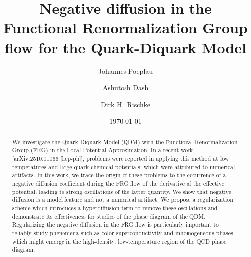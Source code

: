 \documentclass[
onecolumn,
aps,
prd,
amsmath,
amssymb,
nofootinbib
]{revtex4-2}
\begin{document}

\title{\textbf{Negative diffusion in the Functional Renormalization Group flow for the Quark-Diquark Model} 
}%


\author{Johannes Poeplau}
\author{Ashutosh Dash}%


\author{Dirk H.~Rischke}


\date{\today}%

\begin{abstract} 
We investigate the Quark-Diquark Model (QDM) with the Functional Renormalization Group (FRG)  in the Local Potential Approximation. 
In a recent work [arXiv:2510.01066 [hep-ph]], problems were reported in applying this method at low temperatures and large quark chemical potentials, which were attributed to numerical artifacts.
In this work, we trace the origin of these problems to the occurrence of a negative diffusion coefficient during the FRG flow of the derivative of the effective potential, leading to strong oscillations of the latter quantity. 
We show that negative diffusion is a model feature and not a numerical artifact.
We propose a regularization scheme which introduces a hyperdiffusion term to remove these oscillations and demonstrate its effectiveness for studies of the phase diagram of the QDM. 
Regularizing the negative diffusion in the FRG flow is particularly important to reliably study phenomena such as color superconductivity and inhomogeneous phases, which might emerge in the high-density, low-temperature region of the QCD phase diagram.
\end{abstract}

\maketitle
\end{document}
